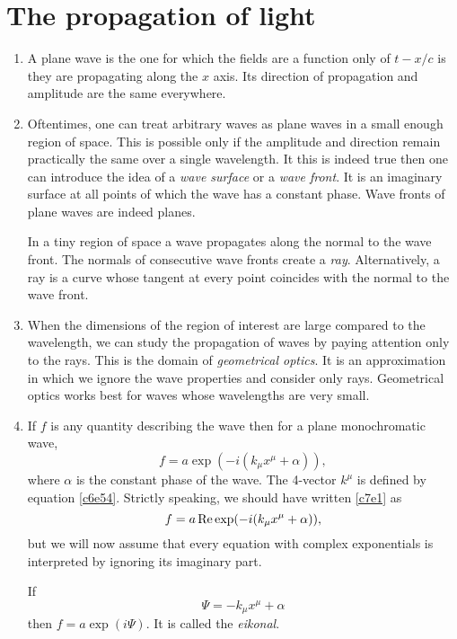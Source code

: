 \chapter{The propagation of light}\label{c7}
\begin{enumerate}
\item A plane wave is the one for which the fields are a function only of $t - x/c$
is they are propagating along the $x$ axis. Its direction of propagation and amplitude
are the same everywhere.

\item Oftentimes, one can treat arbitrary waves as plane waves in a small enough
region of space. This is possible only if the amplitude and direction remain 
practically the same over a single wavelength. It this is indeed true then one 
can introduce the idea of a \emph{wave surface} or a \emph{wave front}. It is an
imaginary surface at all points of which the wave has a constant phase. Wave fronts
of plane waves are indeed planes.

In a tiny region of space a wave propagates along the normal to the wave front.
The normals of consecutive wave fronts create a \emph{ray}. Alternatively, a ray
is a curve whose tangent at every point coincides with the normal to the wave
front.

\item When the dimensions of the region of interest are large compared to the
wavelength, we can study the propagation of waves by paying attention only to
the rays. This is the domain of \emph{geometrical optics}. It is an approximation
in which we ignore the wave properties and consider only rays. Geometrical optics
works best for waves whose wavelengths are very small.

\item If $f$ is any quantity describing the wave then for a plane monochromatic 
wave,
\begin{equation}\label{c7e1}
f = a\exp(-i(k_\mu x^\mu + \alpha)),
\end{equation}
where $\alpha$ is the constant phase of the wave. The 4-vector $k^\mu$ is defined
by equation \eqref{c6e54}. Strictly speaking, we should have written \eqref{c7e1}
as
\[
f = a\operatorname{Re}{\exp(-i(k_\mu x^\mu + \alpha))},
\]
but we will now assume that every equation with complex exponentials is 
interpreted by ignoring its imaginary part.

If 
\begin{equation}\label{c7e2}
\Psi = -k_\mu x^\mu + \alpha
\end{equation}
then $f = a\exp(i\Psi)$. It is called the \emph{eikonal}.


\end{enumerate}
